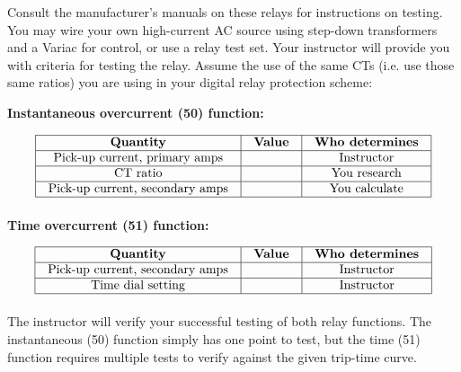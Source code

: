 Consult the manufacturer's manuals on these relays for instructions on testing.  You may wire your own high-current AC source using step-down transformers and a Variac for control, or use a relay test set.  Your instructor will provide you with criteria for testing the relay.  Assume the use of the same CTs (i.e. use those same ratios) you are using in your digital relay protection scheme:

\vskip 20pt

\noindent
{\bf Instantaneous overcurrent (50) function:}


$$\vbox{\offinterlineskip
\halign{\strut
\vrule \quad\hfil # \ \hfil & 
\vrule \quad\hfil # \ \hfil & 
\vrule \quad\hfil # \ \hfil \vrule \cr
\noalign{\hrule}
%
{\bf Quantity} & {\bf Value} & {\bf Who determines} \cr
%
\noalign{\hrule}
%
Pick-up current, primary amps &  & Instructor \cr
%
\noalign{\hrule}
%
CT ratio &  & You research \cr
%
\noalign{\hrule}
%
Pick-up current, secondary amps &  & You calculate \cr
%
\noalign{\hrule}
} %
}$$ %


\vskip 20pt

\noindent
{\bf Time overcurrent (51) function:}


$$\vbox{\offinterlineskip
\halign{\strut
\vrule \quad\hfil # \ \hfil & 
\vrule \quad\hfil # \ \hfil & 
\vrule \quad\hfil # \ \hfil \vrule \cr
\noalign{\hrule}
%
{\bf Quantity} & {\bf Value} & {\bf Who determines} \cr
%
\noalign{\hrule}
%
Pick-up current, secondary amps &  & Instructor \cr
%
\noalign{\hrule}
%
Time dial setting &  & Instructor \cr
%
\noalign{\hrule}
} %
}$$ %

The instructor will verify your successful testing of both relay functions.  The instantaneous (50) function simply has one point to test, but the time (51) function requires multiple tests to verify against the given trip-time curve.












\vfil \eject

